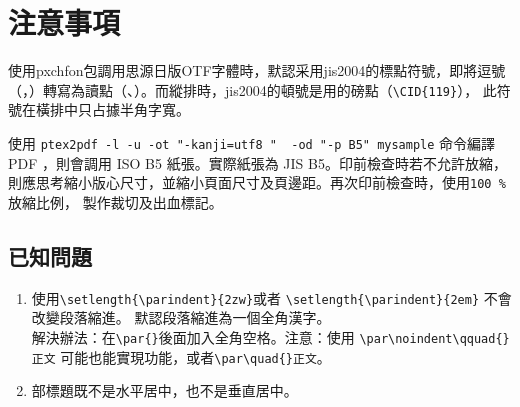 \section{注意事項}

\par 使用pxchfon包調用思源日版OTF字體時，默認采用jis2004的標點符號，即將逗號
（，）轉寫為讀點（、）。而縱排時，jis2004的頓號是用的磅點（\verb+\CID{119}+），
此符號在橫排中只占據半角字寬。

\vspace{5mm}
\par 使用 {\color{red}\verb+ptex2pdf -l -u -ot "-kanji=utf8 "  -od "-p B5" mysample+}
 命令編譯 PDF ，則會調用 ISO B5 紙張。實際紙張為 JIS B5。印前檢查時若不允許放縮，
 則應思考縮小版心尺寸，並縮小頁面尺寸及頁邊距。再次印前檢查時，使用{\color{red}\verb+100 % +} 放縮比例，
 製作裁切及出血標記。

\subsection{已知問題}

\begin{enumerate}
\item 使用{\color{red}\verb+\setlength{\parindent}{2zw}+}或者
{\color{red}\verb+\setlength{\parindent}{2em}+} 不會改變段落縮進。
默認段落縮進為一個全角漢字。\\
解決辦法：在\verb+\par{}+後面加入全角空格。注意：使用
{\color{red}\verb+\par\noindent\qquad{}正文+}\quad
可能也能實現功能，或者{\color{red}\verb+\par\quad{}正文+}。
\item 部標題既不是水平居中，也不是垂直居中。
\end{enumerate}

